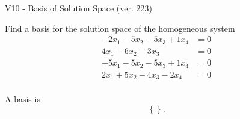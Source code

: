 \begin{exercise}
  \begin{exerciseTitle}V10 - Basis of Solution Space (ver. 223)\end{exerciseTitle}
  \begin{exerciseStatement}
    Find a basis for the solution space of the homogeneous system 
\begin{align*}
 -2 x_ 1 -5 x_ 2 -5 x_ 3 + 1 x_ 4 &= 0  \\ 
  4 x_ 1 -6 x_ 2 -3 x_ 3 &= 0  \\ 
  -5 x_ 1 -5 x_ 2 -5 x_ 3 + 1 x_ 4 &= 0  \\ 
  2 x_ 1 + 5 x_ 2 -4 x_ 3 -2 x_ 4 &= 0  \\ 
 \end{align*}


 
  \end{exerciseStatement}

  \begin{exerciseAnswer}
   A basis is   
\[\left\{\right\}.\]

  


  \end{exerciseAnswer}
\end{exercise}